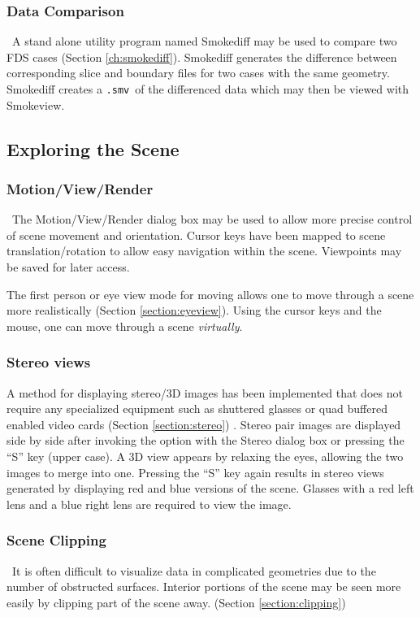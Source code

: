 \documentclass[11pt,twoside]{book}
\begin{document}
\subsubsection{Data Comparison}\ A stand alone utility program named Smokediff
may be used to compare two FDS cases (Section \ref{ch:smokediff}).
Smokediff generates the difference between corresponding slice and boundary
files for two cases with the same geometry.  Smokediff creates a
{\tt .smv}\ of the differenced data which may then be viewed with Smokeview.


\subsection{Exploring the Scene}

\subsubsection{Motion/View/Render}\ The Motion/View/Render dialog box may be used to
allow more precise control of scene movement and orientation.
Cursor keys have been mapped to scene translation/rotation to
allow easy navigation within the scene.  Viewpoints may be saved for later access.

The first person or eye view mode for moving
allows one to move through a scene more
realistically (Section \ref{section:eyeview}).  Using the cursor keys and the
mouse, one can move through a scene {\em virtually}.

\subsubsection{Stereo views}A method for displaying stereo/3D
images has been implemented that does
not require any specialized equipment such as shuttered glasses or
quad buffered enabled video cards (Section \ref{section:stereo}) .
Stereo pair images are displayed side by side after invoking the option with
the Stereo dialog box or pressing the ``S'' key (upper case).
A 3D view appears by relaxing the eyes, allowing the two images to merge into one.
Pressing the ``S'' key again results in stereo views generated by
displaying red and blue versions of the scene.
Glasses with a red left lens and a blue right lens are required to view the image.

\subsubsection{Scene Clipping}\ It is often difficult to visualize data
in complicated geometries due to the number of obstructed
surfaces. Interior portions of the scene may be seen more easily
by clipping part of the scene away. (Section
\ref{section:clipping})
\end{document}

